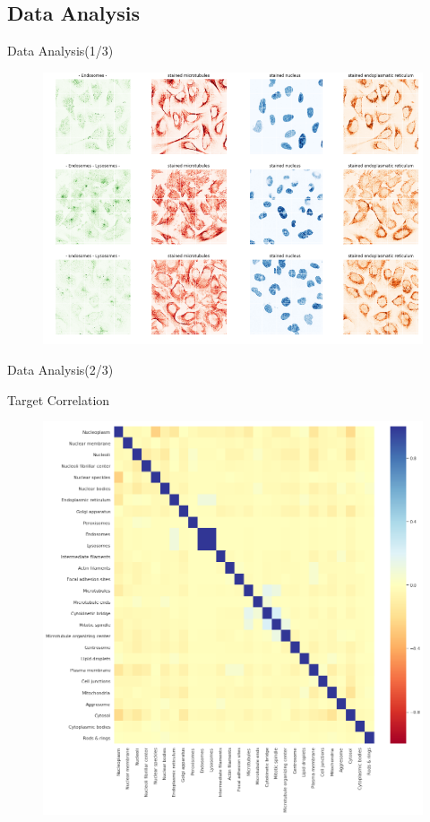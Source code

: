 \documentclass[unknownkeysallowed]{beamer}
\begin{document}
	\subsection{Data Analysis}
	\begin{frame}{Data Analysis(1/3)}
		\begin{figure}
			\includegraphics[width=0.8\paperwidth,height=0.8\paperheight]{images/data_analysis_0}
		\end{figure}
	\end{frame}
	\begin{frame}{Data Analysis(2/3)}
	\begin{block}{Target Correlation}
		\begin{figure}
			\includegraphics[width=0.8\paperwidth,height=0.8\paperheight]{images/data_analysis_3}
		\end{figure}
	\end{block}
	\end{frame}
	
\end{document}

